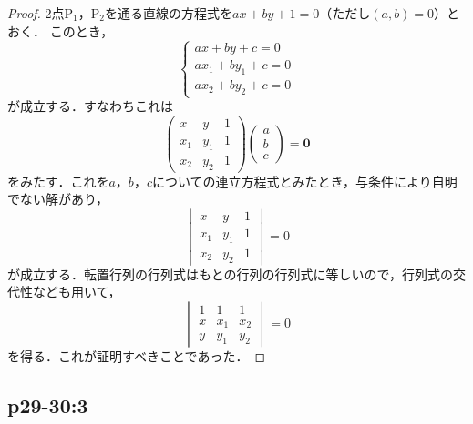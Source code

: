 \documentclass[uplatex,dvipdfmx,a4paper,10pt,fleqn]{jsarticle}
\begin{document}
\begin{tleftbar}
    \begin{proof}
    2点$\mathrm{P}_1$，$\mathrm{P_2}$を通る直線の方程式を$ax+by+1=0$（ただし$(a,b)=0$）とおく．
    このとき，
    \[
        \begin{cases}
            ax+by+c =0 \\
            ax_1 + by_1 +c=0 \\
            ax_2 + by_2 +c =0
        \end{cases}
    \]
    が成立する．すなわちこれは
    \[
        \begin{pmatrix} 
            x & y & 1 \\
            x_1 & y_1 & 1 \\
            x_2 & y_2 & 1 
        \end{pmatrix}
        \begin{pmatrix}
            a \\
            b \\
            c
        \end{pmatrix}
        = \bm{0}
    \]
    をみたす．これを$a$，$b$，$c$についての連立方程式とみたとき，与条件により自明でない解があり，
    \[
    \begin{vmatrix} 
        x & y & 1 \\
        x_1 & y_1 & 1 \\
        x_2 & y_2 & 1 
    \end{vmatrix}
    =0
    \]
    が成立する．転置行列の行列式はもとの行列の行列式に等しいので，行列式の交代性なども用いて，
    \[ 
    \begin{vmatrix} 
        1 & 1 & 1 \\
        x & x_1 & x_2 \\
        y & y_1 & y_2 
    \end{vmatrix}
    =0
    \]
を得る．これが証明すべきことであった．
\end{proof}
\end{tleftbar}



\subsection*{p29-30:3}
\end{document}
